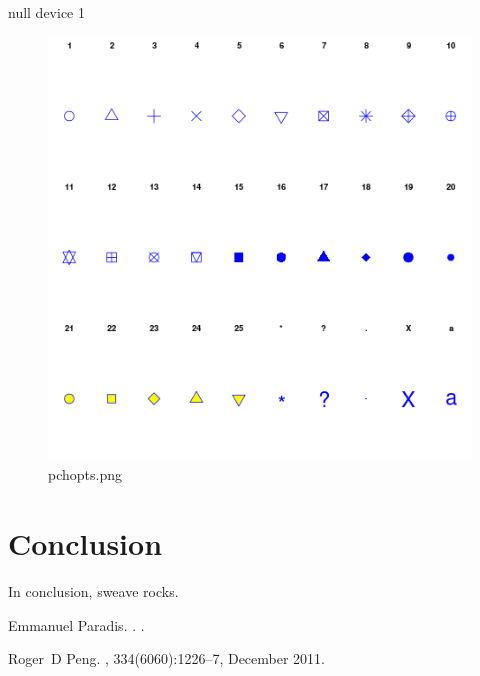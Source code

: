 \documentclass[a4paper]{article}
\begin{document}
\begin{Schunk}
\begin{Soutput}
null device 
          1 
\end{Soutput}
\end{Schunk}
\begin{figure}[!h]
\centering
\includegraphics[width=\textwidth]{pchopts.png}
\caption{pchopts.png}
\label{fig:pchopts.png}
\end{figure}


\section{Conclusion}
In conclusion, sweave rocks.


\begin{thebibliography}{1}
Emmanuel Paradis.
.
.

Roger~D Peng.
, 334(6060):1226--7, December 2011.

\end{thebibliography}
\end{document}
